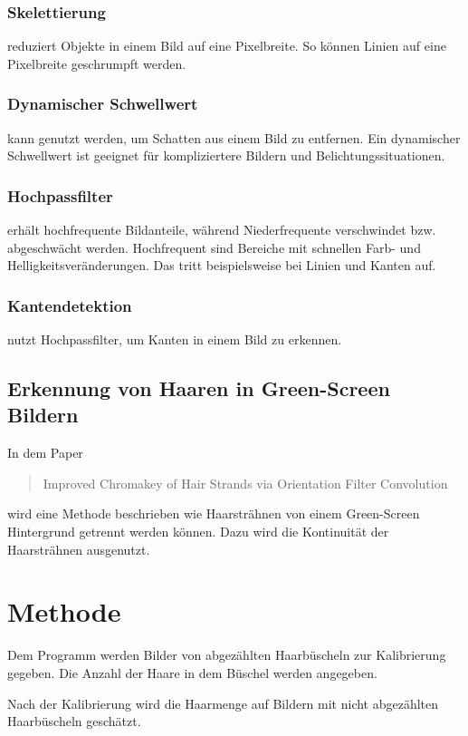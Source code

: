 \documentclass[german,a4paper,12pt]{llncs}
\begin{document}
\subsubsection{Skelettierung}
reduziert Objekte in einem Bild auf eine Pixelbreite. So können Linien auf eine Pixelbreite geschrumpft werden.

\subsubsection{Dynamischer Schwellwert}
kann genutzt werden, um Schatten aus einem Bild zu entfernen. Ein dynamischer Schwellwert ist geeignet für kompliziertere Bildern und Belichtungssituationen.


\subsubsection{Hochpassfilter}
erhält hochfrequente Bildanteile, während Niederfrequente verschwindet bzw. abgeschwächt werden. 
Hochfrequent sind Bereiche mit schnellen Farb- und Helligkeitsveränderungen. Das tritt beispielsweise bei Linien und Kanten auf.

\subsubsection{Kantendetektion}

nutzt Hochpassfilter, um Kanten in einem Bild zu erkennen. 

\subsection{Erkennung von Haaren in Green-Screen Bildern}

In dem Paper\blockquote{Improved Chromakey of Hair Strands via Orientation Filter Convolution} wird eine Methode beschrieben wie Haarsträhnen von einem Green-Screen Hintergrund getrennt werden können. Dazu wird die Kontinuität der Haarsträhnen ausgenutzt. \cite{GreenScreenHair}

\section{Methode}
Dem Programm werden Bilder von abgezählten Haarbüscheln zur Kalibrierung gegeben. Die Anzahl der Haare in dem Büschel werden angegeben. 

Nach der Kalibrierung wird die Haarmenge auf Bildern mit nicht abgezählten Haarbüscheln geschätzt.
\end{document}
